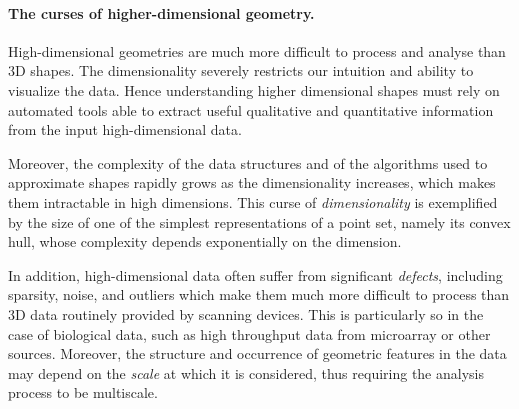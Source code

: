 



\paragraph{The curses of higher-dimensional geometry.} 

High-dimensional geometries are much more difficult to process and analyse than 3D shapes. The dimensionality severely restricts our intuition and ability to visualize the data. Hence  understanding higher dimensional shapes must rely on automated tools able to extract useful qualitative and quantitative information from the input high-dimensional data.

Moreover, the complexity of the data structures and of the algorithms used to  approximate shapes  rapidly grows as the dimensionality increases, which makes them intractable in high dimensions.  This curse of {\em dimensionality} is exemplified by the size of one of the simplest representations of a point set, namely its convex hull, whose complexity depends exponentially on the dimension. 

In addition, high-dimensional data often suffer from significant {\em defects}, including sparsity, noise, and outliers  which make them much more difficult to process than 3D data routinely provided by scanning devices. This is particularly so in the case of biological data, such as high throughput data from microarray or other sources. Moreover, the structure and occurrence of geometric features in the data may depend on the {\em scale} at which it is considered, thus requiring the analysis process to be multiscale.  

